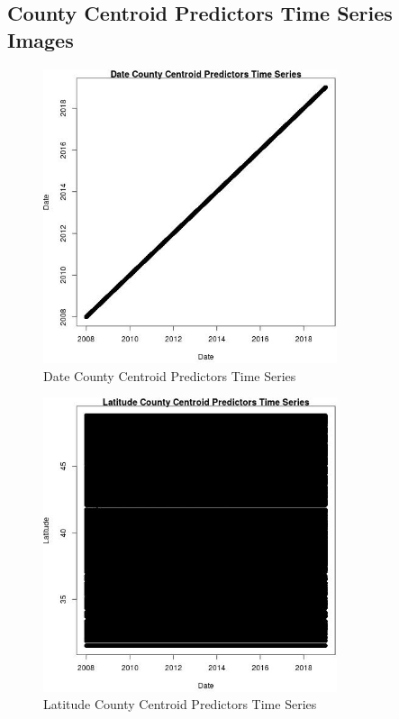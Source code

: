 
\subsection{County Centroid Predictors Time Series Images} 
 

\begin{figure} 
\centering  
\includegraphics[width=0.77\textwidth]{Code_Outputs/df_report_ML_predictors_CountyCentroid_Locations_Dates_2008-01-01to2018-12-31_DatevDate.jpg} 
\caption{\label{fig:df_report_ML_predictors_CountyCentroid_Locations_Dates_2008-01-01to2018-12-31DatevDate}Date County Centroid Predictors Time Series} 
\end{figure} 
 

\begin{figure} 
\centering  
\includegraphics[width=0.77\textwidth]{Code_Outputs/df_report_ML_predictors_CountyCentroid_Locations_Dates_2008-01-01to2018-12-31_LatitudevDate.jpg} 
\caption{\label{fig:df_report_ML_predictors_CountyCentroid_Locations_Dates_2008-01-01to2018-12-31LatitudevDate}Latitude County Centroid Predictors Time Series} 
\end{figure} 
 

